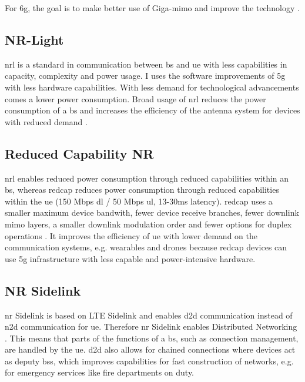 \documentclass[11pt,a4paper]{article}
\begin{document}
For \acrshort{6g}, the goal is to make better use of Giga-\acrshort{mimo} and improve the technology \citep{3gpp17}.

\subsection{NR-Light}\label{subsec:nrlight}
\acrfull{nrl} is a standard in communication between \acrshort{bs} and \acrshort{ue} with less capabilities in capacity, complexity and power usage.
I uses the software improvements of \acrshort{5g} with less hardware capabilities.
With less demand for technological advancements comes a lower power consumption.
Broad usage of \acrshort{nrl} reduces the power consumption of a \acrlong{bs} and increases the efficiency of the antenna system for devices with reduced demand \citep{3gpp17}.

\subsection{Reduced Capability NR}\label{subsec:RedCap}
\acrshort{nrl} enables reduced power consumption through reduced capabilities within an \acrshort{bs}, whereas \acrfull{redcap} reduces power consumption through reduced capabilities within the \acrshort{ue} (150 Mbps \acrshort{dl} / 50 Mbps \acrshort{ul}, 13-30ms latency).
\acrshort{redcap} uses a smaller maximum device bandwith, fewer device receive branches, fewer downlink \acrshort{mimo} layers, a smaller downlink modulation order and fewer options for duplex operations \citep{3gpp17}.
It improves the efficiency of \acrshort{ue} with lower demand on the communication systems, e.g. wearables and drones because \acrshort{redcap} devices can use \acrshort{5g} infrastructure with less capable and power-intensive hardware. 

\subsection{NR Sidelink}\label{subsec:sidelink}
\acrshort{nr} Sidelink is based on LTE Sidelink and enables \acrfull{d2d} communication instead of \acrfull{n2d} communication for \acrshort{ue}.
Therefore \acrshort{nr} Sidelink enables Distributed Networking \citep{3gpp17}.
This means that parts of the functions of a \acrshort{bs}, such as connection management, are handled by the \acrshort{ue}.
\acrlong{d2d} also allows for chained connections where devices act as deputy \acrlong{bs}s, which improves capabilities for fast construction of networks, e.g. for emergency services like fire departments on duty.
\end{document}
